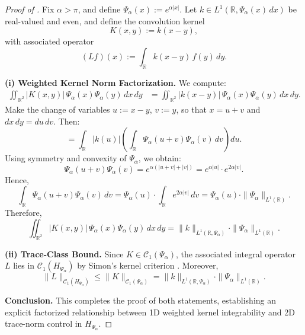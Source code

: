 \begin{proof}[Proof of ]
Fix \( \alpha > \pi \), and define \( \Psi_\alpha(x) := e^{\alpha |x|} \). Let \( k \in L^1(\mathbb{R}, \Psi_\alpha(x)\, dx) \) be real-valued and even, and define the convolution kernel
\[
K(x,y) := k(x - y),
\]
with associated operator
\[
(L f)(x) := \int_{\mathbb{R}} k(x - y)\, f(y)\, dy.
\]

\medskip
\noindent\textbf{(i) Weighted Kernel Norm Factorization.}
We compute:
\begin{align*}
\iint_{\mathbb{R}^2} |K(x,y)|\, \Psi_\alpha(x)\Psi_\alpha(y)\, dx\, dy
&= \iint_{\mathbb{R}^2} |k(x - y)|\, \Psi_\alpha(x)\Psi_\alpha(y)\, dx\, dy.
\end{align*}
Make the change of variables \( u := x - y \), \( v := y \), so that \( x = u + v \) and \( dx\,dy = du\,dv \). Then:
\[
= \int_{\mathbb{R}} |k(u)| \left( \int_{\mathbb{R}} \Psi_\alpha(u + v)\Psi_\alpha(v)\, dv \right) du.
\]
Using symmetry and convexity of \( \Psi_\alpha \), we obtain:
\[
\Psi_\alpha(u + v)\Psi_\alpha(v) = e^{\alpha(|u + v| + |v|)} = e^{\alpha|u|} \cdot e^{2\alpha|v|}.
\]
Hence,
\[
\int_{\mathbb{R}} \Psi_\alpha(u + v)\Psi_\alpha(v)\, dv = \Psi_\alpha(u) \cdot \int_{\mathbb{R}} e^{2\alpha |v|}\, dv = \Psi_\alpha(u) \cdot \|\Psi_\alpha\|_{L^1(\mathbb{R})}.
\]
Therefore,
\[
\iint_{\mathbb{R}^2} |K(x,y)|\, \Psi_\alpha(x)\Psi_\alpha(y)\, dx\, dy
= \|k\|_{L^1(\mathbb{R}, \Psi_\alpha)} \cdot \|\Psi_\alpha\|_{L^1(\mathbb{R})}.
\]

\medskip
\noindent\textbf{(ii) Trace-Class Bound.}
Since \( K \in \mathcal{C}_1(\Psi_\alpha) \), the associated integral operator \( L \) lies in \( \mathcal{C}_1(H_{\Psi_\alpha}) \) by Simon’s kernel criterion \cite[Thm.~4.2]{Simon2005TraceIdeals}. Moreover,
\[
\|L\|_{\mathcal{C}_1(H_{\Psi_\alpha})} \le \|K\|_{\mathcal{C}_1(\Psi_\alpha)}
= \|k\|_{L^1(\mathbb{R}, \Psi_\alpha)} \cdot \|\Psi_\alpha\|_{L^1(\mathbb{R})}.
\]

\medskip
\noindent\textbf{Conclusion.}
This completes the proof of both statements, establishing an explicit factorized relationship between 1D weighted kernel integrability and 2D trace-norm control in \( H_{\Psi_\alpha} \).
\end{proof}
